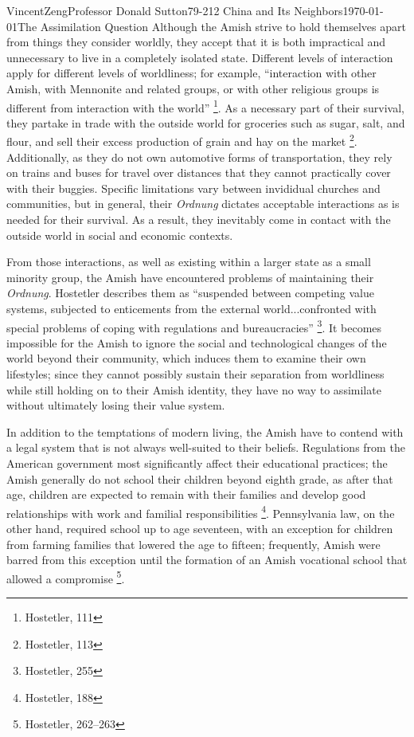 \documentclass{article}[12pt]
\begin{document}
\begin{mla}{Vincent}{Zeng}{Professor Donald Sutton}{79-212 China and Its Neighbors}{\today}{The Assimilation Question}
Although the Amish strive to hold themselves apart from things they consider
worldly, they accept that it is both impractical and unnecessary to live in a
completely isolated state. Different levels of interaction apply for different
levels of worldliness; for example, ``interaction with other Amish, with
Mennonite and related groups, or with other religious groups is different from
interaction with the world'' \footnote{Hostetler, 111}. As a necessary part of
their survival, they partake in trade with the outside world for groceries such
as sugar, salt, and flour, and sell their excess production of grain and hay on
the market \footnote{Hostetler, 113}. Additionally, as they do not own
automotive forms of transportation, they rely on trains and buses for travel
over distances that they cannot practically cover with their buggies. Specific
limitations vary between invididual churches and communities, but in general,
their \textit{Ordnung} dictates acceptable interactions as is needed for their
survival. As a result, they inevitably come in contact with the outside world in social and
economic contexts.

From those interactions, as well as existing within a larger state as a small
minority group, the Amish have encountered problems of maintaining their
\textit{Ordnung}. Hostetler describes them as ``suspended between competing
value systems, subjected to enticements from the external world...confronted
with special problems of coping with regulations and bureaucracies''
\footnote{Hostetler, 255}. It becomes impossible for the Amish to ignore the
social and technological changes of the world beyond their community, which
induces them to examine their own lifestyles; since they cannot possibly
sustain their separation from worldliness while still holding on to their Amish
identity, they have no way to assimilate without ultimately losing their value
system.

In addition to the temptations of modern living, the Amish have to contend with
a legal system that is not always well-suited to their beliefs. Regulations
from the American government most significantly affect their educational
practices; the Amish generally do not
school their children beyond eighth grade, as after that age, children are
expected to remain with their families and develop good relationships with work
and familial responsibilities \footnote{Hostetler, 188}. Pennsylvania law, on the other
hand, required school up to age seventeen, with an exception for children from
farming families that lowered the age to fifteen; frequently, Amish were barred
from this exception until the formation of an Amish vocational school that
allowed a compromise \footnote{Hostetler, 262--263}.


\end{mla}
\end{document}
